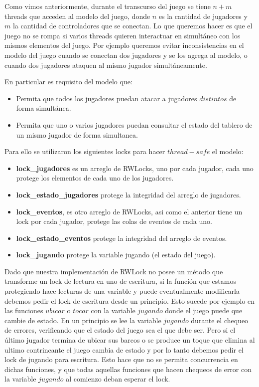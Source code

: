 Como vimos anteriormente, durante el transcurso del juego se tiene $n + m$ threads que acceden al modelo del juego, donde $n$ es la cantidad de jugadores y $m$ la cantidad de controladores que se conectan. 
Lo que queremos hacer es que el juego no se rompa si varios threads quieren interactuar en simultáneo con los mismos elementos del juego. Por ejemplo queremos evitar inconsistencias en el modelo del juego cuando se conectan dos jugadores y se los agrega al modelo, o cuando dos jugadores ataquen al mismo jugador simultáneamente.


En particular es requisito del modelo que: 
\begin{itemize}
	\item Permita que todos los jugadores puedan atacar a jugadores $distintos$ de forma simultánea.
	\item Permita que uno o varios jugadores puedan consultar el estado del tablero de un mismo jugador de forma simultanea.
\end{itemize}


Para ello se utilizaron los siguientes locks para hacer $thread-safe$ el modelo:
\begin{itemize}
	\item	\textbf{lock\_jugadores} es un arreglo de RWLocks, uno por cada jugador, cada uno protege los elementos de cada uno de los jugadores.
	\item	\textbf{lock\_estado\_jugadores} protege la integridad del arreglo de jugadores.
	\item	\textbf{lock\_eventos}, es otro arreglo de RWLocks, asi como el anterior tiene un lock por cada jugador, protege las colas de eventos de cada uno.
	\item	\textbf{lock\_estado\_eventos} protege la integridad del arreglo de eventos.
	\item	\textbf{lock\_jugando} protege la variable jugando (el estado del juego).
\end{itemize}

Dado que nuestra implementación de RWLock no posee un método que transforme un lock de lectura en uno de escritura, si la función que estamos protegiendo hace lecturas de una variable y puede eventualmente modificarla debemos pedir el lock de escritura desde un principio. Esto sucede por ejemplo en las funciones $ubicar$ o $tocar$ con la variable $jugando$ donde el juego puede que cambie de estado. En un principio se lee la variable $jugando$ durante el chequeo de errores, verificando que el estado del juego sea el que debe ser. Pero si el último jugador termina de ubicar sus barcos o se produce un toque que elimina al ultimo contrincante el juego cambia de estado y por lo tanto debemos pedir el lock de jugando para escritura. Esto hace que no se permita concurrencia en dichas funciones, y que todas aquellas funciones que hacen chequeos de error con la variable $jugando$ al comienzo deban esperar el lock.



